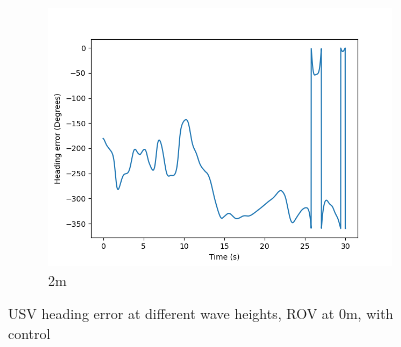\documentclass[class=article, crop=false]{standalone}
\begin{document}
\begin{figure}
\begin{subfigure}[b]{0.48\textwidth}
        \centering
        \includegraphics{scenario1/rov-0m/2.0m/usv_heading_error_controlled}
        \caption{2m}
        \label{}
    \end{subfigure}

    \caption{USV heading error at different wave heights, ROV at 0m, with control}
\end{figure}
\end{document}
